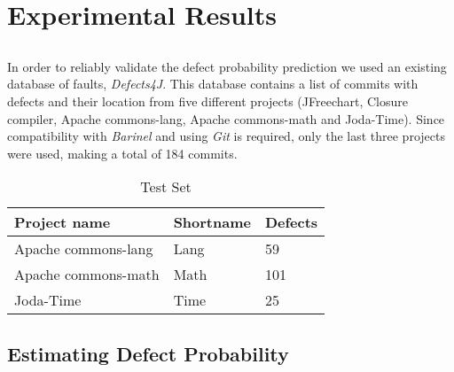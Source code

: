 \chapter{Experimental Results} \label{chap:exp-results}

\section*{}

In order to reliably validate the defect probability prediction we used an existing database of faults, \emph{Defects4J}.
This database contains a list of commits with defects and their location from five different projects (JFreechart, Closure compiler, Apache commons-lang, Apache commons-math and Joda-Time).
Since compatibility with \emph{Barinel} and using \emph{Git} is required, only the last three projects were used, making a total of 184 commits.
%
\begin{table}[H]
	\centering
	\begin{tabular}{|l|l|l|}
	\hline
	\textbf{Project name} & \textbf{Shortname} & \textbf{Defects} \\ \hline
	Apache commons-lang   & Lang               & 59               \\ \hline
	Apache commons-math   & Math               & 101              \\ \hline
	Joda-Time             & Time               & 25               \\ \hline
	\end{tabular}
	\caption{Test Set}
	\label{test-set}
\end{table}

\section{Estimating Defect Probability}


